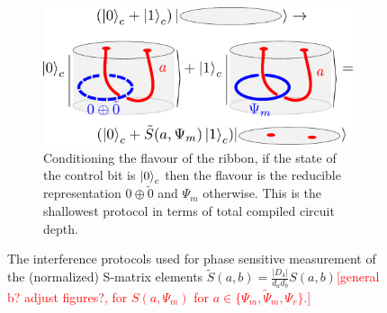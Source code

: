 \documentclass[two column]{article}
\newcommand{\caro}[1]{\textcolor{red}{[#1]}}
\begin{document}
\begin{figure}
\vspace{15pt}

\begin{subfigure}{0.47\textwidth}
    \includegraphics[width=\linewidth]{Figures/intefFlav.pdf}
    \caption{Conditioning the flavour of the ribbon, if the state of the control bit is $\ket{0}_c$ then the flavour is the reducible representation $0\oplus\tilde{0}$ and $\Psi_m$ otherwise. This is the shallowest protocol in terms of total compiled circuit depth.}
    \label{fig:cond_flav}
\end{subfigure}

\caption{The interference protocols used for phase sensitive measurement of the (normalized) S-matrix elements  $\tilde{S}(a,b) = \frac{|D_4|}{d_a d_b}S(a,b)$\caro{general b? adjust figures?, for
$S(a, \Psi_m)$ for $a\in\{\Psi_m, \tilde{\Psi}_m, \Psi_r\}$.}}
\label{fig:S-mat}
\end{figure}
\end{document}

